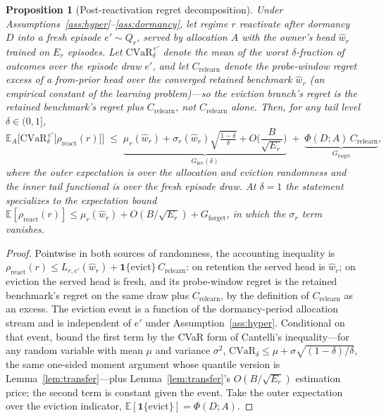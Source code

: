 \documentclass{article}
\newtheorem{proposition}{Proposition}
\newcommand{\E}{\mathbb{E}}
\newcommand{\regret}{\rho}
\newcommand{\Ginv}{G_{\mathrm{inv}}}
\newcommand{\Gforget}{G_{\mathrm{forget}}}
\begin{document}
\begin{proposition}[Post-reactivation regret decomposition]
\label{prop:decomp}
Under Assumptions~\ref{ass:hyper}--\ref{ass:dormancy}, let regime $r$
reactivate after dormancy $D$ into a fresh episode $e' \sim Q_r$, served
by allocation $A$ with the owner's head $\hat w_r$ trained on $E_r$
episodes. Let $\mathrm{CVaR}_\delta^{\,e'}$ denote the mean of the worst
$\delta$-fraction of outcomes over the episode draw $e'$, and let
$C_{\mathrm{relearn}}$ denote the probe-window regret \emph{excess} of a
from-prior head over the converged retained benchmark $\hat w_r$ (an
empirical constant of the learning problem)---so the eviction branch's
regret is the retained benchmark's regret \emph{plus}
$C_{\mathrm{relearn}}$, not $C_{\mathrm{relearn}}$ alone. Then, for any
tail level $\delta \in (0, 1]$,
\[
  \E_{A}\Big[\mathrm{CVaR}_{\delta}^{\,e'}
  \big[\regret_{\mathrm{react}}(r)\big]\Big]
  \;\le\;
  \underbrace{\mu_r(\hat w_r)
  + \sigma_r(\hat w_r)\sqrt{\tfrac{1-\delta}{\delta}}
  + O\!\Big(\frac{B}{\sqrt{E_r}}\Big)}_{\textstyle \Ginv(\delta)}
  \;+\;
  \underbrace{\Phi(D; A)\, C_{\mathrm{relearn}}}_{\textstyle \Gforget},
\]
where the outer expectation is over the allocation and eviction
randomness and the inner tail functional is over the fresh episode draw.
At $\delta = 1$ the statement specializes to the expectation bound
$\E[\regret_{\mathrm{react}}(r)] \le \mu_r(\hat w_r) + O(B/\sqrt{E_r})
+ \Gforget$, in which the $\sigma_r$ term vanishes.
\end{proposition}

\begin{proof}
Pointwise in both sources of randomness, the accounting inequality is
$\regret_{\mathrm{react}}(r) \le L_{r,e'}(\hat w_r) +
\mathbf{1}\{\text{evict}\}\, C_{\mathrm{relearn}}$: on retention the
served head is $\hat w_r$; on eviction the served head is fresh, and its
probe-window regret is the retained benchmark's regret on the same draw
plus $C_{\mathrm{relearn}}$, by the definition of $C_{\mathrm{relearn}}$
as an excess. The eviction event is a function of the dormancy-period
allocation stream and is independent of $e'$ under
Assumption~\ref{ass:hyper}. Conditional on that event, bound the first
term by the CVaR form of Cantelli's inequality---for any random variable
with mean $\mu$ and variance $\sigma^2$, $\mathrm{CVaR}_\delta \le \mu +
\sigma\sqrt{(1-\delta)/\delta}$, the same one-sided moment argument
whose quantile version is Lemma~\ref{lem:transfer}---plus
Lemma~\ref{lem:transfer}'s $O(B/\sqrt{E_r})$ estimation price; the
second term is constant given the event. Take the outer expectation over
the eviction indicator, $\E[\mathbf{1}\{\text{evict}\}] = \Phi(D; A)$.
\end{proof}
\end{document}
